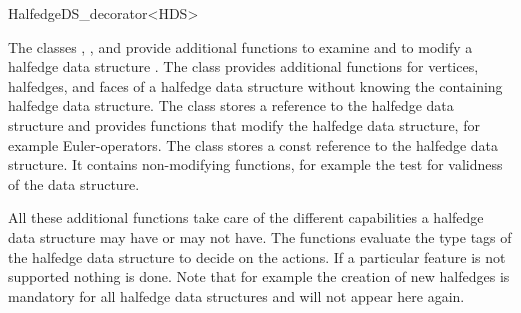 
\ccRefPageBegin



\begin{ccRefClass}{HalfedgeDS_decorator<HDS>}

\ccDefinition

The classes ,
, and
 provide additional functions
to examine and to modify a halfedge data structure . The class
 provides additional functions
for vertices, halfedges, and faces of a halfedge data structure
without knowing the containing halfedge data structure. The class
 stores a reference to the halfedge
data structure and provides functions that modify the halfedge data
structure, for example Euler-operators. The class
 stores a const reference to
the halfedge data structure. It contains non-modifying functions, for
example the test for validness of the data structure.

All these additional functions take care of the different capabilities
a halfedge data structure may have or may not have.  The functions
evaluate the type tags of the halfedge data structure to decide on the
actions. If a particular feature is not supported nothing is done.
Note that for example the creation of new halfedges is mandatory for
all halfedge data structures and will not appear here again.


\ccInheritsFrom


\ccCreation
{}

\ccThreeToTwo


\end{ccRefClass}
